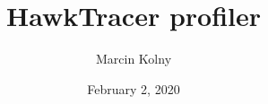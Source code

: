 \documentclass{beamer}
\title[HawkTracer profiler]{HawkTracer profiler}
\author{Marcin Kolny} %
\institute[Amazon Prime Video]
{
  Amazon Prime Video \\
  \textit{marcin.kolny@gmail.com}
}
\date{February 2, 2020}
\begin{document}
\begin{frame}
  \titlepage
\end{frame}

\end{document}
